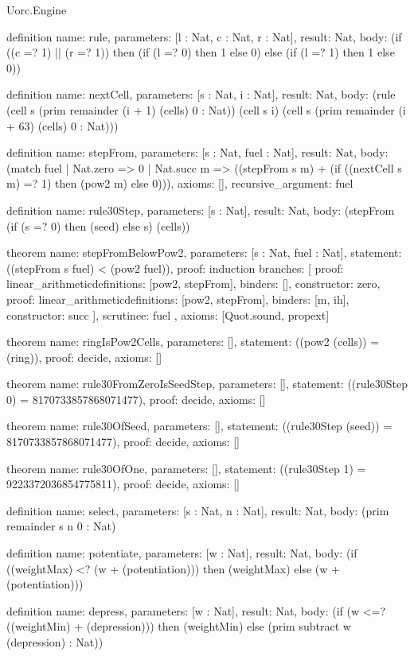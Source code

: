 \begin{lexlean}{Uorc.Engine}
\begin{semanticmodule}
definition{
  name: rule,
  parameters: [l : Nat, c : Nat, r : Nat],
  result: Nat,
  body: (if ((c =? 1) || (r =? 1)) then (if (l =? 0) then 1 else 0) else (if (l =? 1) then 1 else 0))
}

definition{
  name: nextCell,
  parameters: [s : Nat, i : Nat],
  result: Nat,
  body: (rule (cell s (prim remainder (i + 1) (cells) 0 : Nat)) (cell s i) (cell s (prim remainder (i + 63) (cells) 0 : Nat)))
}

definition{
  name: stepFrom,
  parameters: [s : Nat, fuel : Nat],
  result: Nat,
  body: (match fuel
    | Nat.zero => 0
    | Nat.succ m => ((stepFrom s m) + (if ((nextCell s m) =? 1) then (pow2 m) else 0))),
  axioms: [],
  recursive_argument: fuel
}

definition{
  name: rule30Step,
  parameters: [s : Nat],
  result: Nat,
  body: (stepFrom (if (s =? 0) then (seed) else s) (cells))
}

theorem{
  name: stepFromBelowPow2,
  parameters: [s : Nat, fuel : Nat],
  statement: ((stepFrom s fuel) < (pow2 fuel)),
  proof: induction{
    branches: [
      {proof: linear_arithmetic{definitions: [pow2, stepFrom]}, binders: [], constructor: zero},
      {proof: linear_arithmetic{definitions: [pow2, stepFrom]}, binders: [m, ih], constructor: succ}
    ],
    scrutinee: fuel
  },
  axioms: [Quot.sound, propext]
}

theorem{
  name: ringIsPow2Cells,
  parameters: [],
  statement: ((pow2 (cells)) = (ring)),
  proof: decide{},
  axioms: []
}

theorem{
  name: rule30FromZeroIsSeedStep,
  parameters: [],
  statement: ((rule30Step 0) = 8170733857868071477),
  proof: decide{},
  axioms: []
}

theorem{
  name: rule30OfSeed,
  parameters: [],
  statement: ((rule30Step (seed)) = 8170733857868071477),
  proof: decide{},
  axioms: []
}

theorem{
  name: rule30OfOne,
  parameters: [],
  statement: ((rule30Step 1) = 9223372036854775811),
  proof: decide{},
  axioms: []
}

definition{
  name: select,
  parameters: [s : Nat, n : Nat],
  result: Nat,
  body: (prim remainder s n 0 : Nat)
}

definition{
  name: potentiate,
  parameters: [w : Nat],
  result: Nat,
  body: (if ((weightMax) <? (w + (potentiation))) then (weightMax) else (w + (potentiation)))
}

definition{
  name: depress,
  parameters: [w : Nat],
  result: Nat,
  body: (if (w <=? ((weightMin) + (depression))) then (weightMin) else (prim subtract w (depression) : Nat))
}


\end{semanticmodule}
\end{lexlean}
